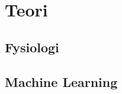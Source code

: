 \thispagestyle{fancy}
\chapter{Teori}
\label{chp:teori}

\section{Fysiologi}
\label{sec:fysiologi}

\section{Machine Learning}